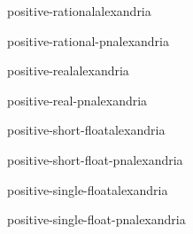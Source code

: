 \begin{type}{positive-rational}{}{alexandria}{}
  
\end{type}

\begin{function}{positive-rational-p}{n}{alexandria}{}
  
\end{function}

\begin{type}{positive-real}{}{alexandria}{}
  
\end{type}

\begin{function}{positive-real-p}{n}{alexandria}{}
  
\end{function}

\begin{type}{positive-short-float}{}{alexandria}{}
  
\end{type}

\begin{function}{positive-short-float-p}{n}{alexandria}{}
  
\end{function}

\begin{type}{positive-single-float}{}{alexandria}{}
  
\end{type}

\begin{function}{positive-single-float-p}{n}{alexandria}{}
  
\end{function}
